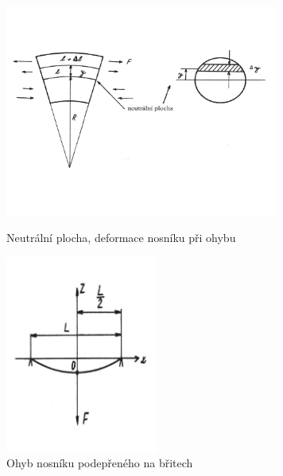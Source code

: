 \documentclass[english]{article}
\begin{document}
	\begin{figure}[h!]
	\centering
	\begin{minipage}{.55\textwidth}
	  \centering
					\includegraphics[width=9cm]{att/neutralni_plocha.pdf}
					\vspace*{-1.5cm}
					\caption{Neutrální plocha, deformace nosníku při ohybu \cite{bib:zadani}}
					\label{fig:s_neutralniplocha}
	\end{minipage}%
	\hfill
	\begin{minipage}{.35\textwidth}
	  \centering
					\includegraphics[width=5cm]{att/ohyb_priklad.pdf}
					\vspace*{-0.5cm}
					\caption{Ohyb nosníku podepřeného na břitech \cite{bib:zadani}}
					\label{fig:s_ohyb_priklad}
	\end{minipage}
	\end{figure}
\end{document}
